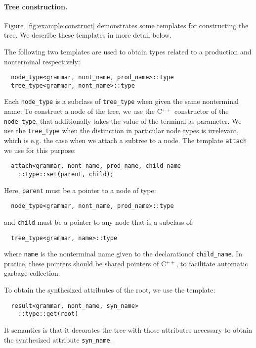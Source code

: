 \documentclass{llncs}
\newcommand*{\Cpp}{C\ensuremath{^{++}}}
\begin{document}
  \paragraph{Tree construction.}
  Figure~\ref{fig:example:construct} demonstrates
  some templates for constructing the tree. We
  describe these templates in more detail below.

  The following two templates are used to obtain
  types related to a production and nonterminal
  respectively:
  \begin{lstlisting}
  node_type<grammar, nont_name, prod_name>::type
  tree_type<grammar, nont_name>::type
  \end{lstlisting}
  Each \lstinline$node_type$ is a subclass of
  \lstinline$tree_type$ when given the same
  nonterminal name. To construct a node of the
  tree, we use the \Cpp{} constructor of the
  \lstinline$node_type$, that additionally
  takes the value of the terminal as parameter. 
  We use the \lstinline$tree_type$ when the
  distinction in particular node types is
  irrelevant, which is e.g. the case when
  we attach a subtree to a node. The
  template \lstinline$attach$ we use for
  this purpose:
  \begin{lstlisting}
  attach<grammar, nont_name, prod_name, child_name
    ::type::set(parent, child);
  \end{lstlisting}
  Here, \lstinline$parent$ must be a pointer to
  a node of type:
  \begin{lstlisting}
  node_type<grammar, nont_name, prod_name>::type
  \end{lstlisting}
  and \lstinline$child$ must be a pointer to
  any node that is a subclass of:
  \begin{lstlisting}
  tree_type<grammar, name>::type
  \end{lstlisting}
  where \lstinline$name$ is the nonterminal name
  given to the declarationof \lstinline$child_name$.
  In pratice, these pointers should be shared pointers
  of \Cpp, to facilitate automatic garbage collection.
  
  To obtain the synthesized attributes of the root,
  we use the template: 
  \begin{lstlisting}
  result<grammar, nont_name, syn_name>
    ::type::get(root)
  \end{lstlisting}
  It semantics is that it decorates the tree with
  those attributes necessary to obtain the
  synthesized attribute \lstinline$syn_name$.
  
\end{document}

